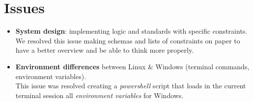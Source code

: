 \documentclass{report}
\begin{document}
    \section{Issues}\label{sec:issues}

        \begin{itemize}
            \item \textbf{System design}: implementing logic and standards with specific constraints.\\
                We resolved this issue making schemas and lists of constraints on paper to have a better overview and be able to think more properly.
            \item \textbf{Environment differences} between Linux \& Windows (terminal commands, environment variables).\\
                This issue was resolved creating a \emph{powershell} script that loads in the current terminal session all \emph{environment variables} for Windows.
        \end{itemize}
\end{document}
